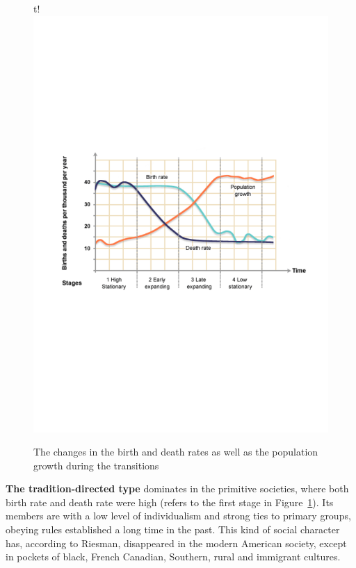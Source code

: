 \begin{figure}{t!}
  \includegraphics[width=\linewidth]{population_changes.pdf}
  \caption{The changes in the birth and death rates as well as the population growth during the transitions}
  \label{background.fig.population}
\end{figure}


\textbf{The tradition-directed type} dominates in the primitive societies, where both birth rate and death rate were high (refers to the first stage in Figure~\ref{background.fig.population}). Its members are with a low level of individualism and strong ties to primary groups, obeying rules established a long time in the past. This kind of social character has, according to Riesman, disappeared in the modern American
society, except in pockets of black, French Canadian, Southern, rural and immigrant cultures. 

